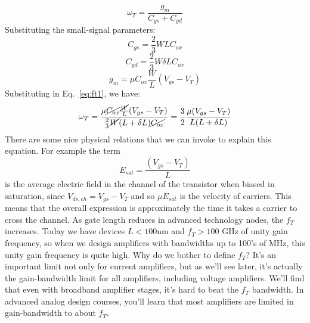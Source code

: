     \begin{equation} 
        {\omega _T} = \frac{{{g_m}}}{{{C_{gs}} + {C_{gd}}}}   \label{eq:ft1}
    \end{equation}
Substituting the small-signal parameters:
    \begin{equation}
        C_{gs} = \frac{2}{3} W L C_{ox}
    \end{equation}
    \begin{equation}
        C_{gd} = \frac{2}{3} W \delta L C_{ox}
    \end{equation}
    \begin{equation}
        g_m = \mu C_{ox} \frac{W}{L} (V_{gs} - V_T)
    \end{equation}
Substituting in Eq.~\ref{eq:ft1}, we have:
    \begin{equation} 
        {\omega _T} = \frac{\mu \cancel{C_{ox}} \frac{\cancel{W}}{L} (V_{gs} - V_T)}{\frac{2}{3} \cancel{W} (L + \delta L) \cancel{C_{ox}}} = \frac{3}{2} \frac{\mu (V_{gs} - V_T)}{L(L+\delta L)}  \label{eq:ft2}
    \end{equation}
There are some nice physical relations that we can invoke to explain this equation.  For example the term
    \begin{equation}
        E_{sat} = \frac{(V_{gs} - V_T)}{L}
    \end{equation}
is the average electric field in the channel of the transistor when biased in saturation, since $V_{ds,ch} = V_{gs} - V_T$ and so $\mu E_{sat}$ is the velocity of carriers.  This means that the overall expression is approximately the time it takes a carrier to cross the channel.  
As gate length reduces in advanced technology nodes, the $f_T$ increases.  Today we have devices $L < 100$nm and $f_T > 100$ GHz of unity gain frequency, so when we design amplifiers with bandwidths up to 100's of MHz, this unity gain frequency is quite high.
Why do we bother to define $f_T$?  It's an important limit not only for current amplifiers, but as we'll see later, it's actually the gain-bandwidth limit for all amplifiers, including voltage amplifiers.  We'll find that even with broadband amplifier stages, it's hard to beat the $f_T$ bandwidth.  In advanced analog design courses, you'll learn that  most amplifiers are limited in gain-bandwidth to about $f_T$. 
